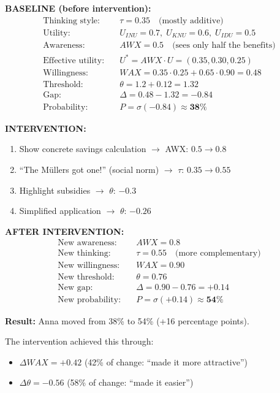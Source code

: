 \begin{example}

\textbf{BASELINE (before intervention):}
\begin{align*}
\text{Thinking style:} \quad & \tau = 0.35 \quad \text{(mostly additive)}\\
\text{Utility:} \quad & U_{INU} = 0.7, \; U_{KNU} = 0.6, \; U_{IDU} = 0.5\\
\text{Awareness:} \quad & AWX = 0.5 \quad \text{(sees only half the benefits)}\\
\text{Effective utility:} \quad & U^* = AWX \cdot U = (0.35, 0.30, 0.25)\\
\text{Willingness:} \quad & WAX = 0.35 \cdot 0.25 + 0.65 \cdot 0.90 = 0.48\\
\text{Threshold:} \quad & \theta = 1.2 + 0.12 = 1.32\\
\text{Gap:} \quad & \Delta = 0.48 - 1.32 = -0.84\\
\text{Probability:} \quad & P = \sigma(-0.84) \approx \mathbf{38\%}
\end{align*}

\textbf{INTERVENTION:}
\begin{enumerate}
\item Show concrete savings calculation $\rightarrow$ AWX: $0.5 \rightarrow 0.8$
\item ``The Müllers got one!'' (social norm) $\rightarrow$ $\tau$: $0.35 \rightarrow 0.55$
\item Highlight subsidies $\rightarrow$ $\theta$: $-0.3$
\item Simplified application $\rightarrow$ $\theta$: $-0.26$
\end{enumerate}

\textbf{AFTER INTERVENTION:}
\begin{align*}
\text{New awareness:} \quad & AWX = 0.8\\
\text{New thinking:} \quad & \tau = 0.55 \quad \text{(more complementary)}\\
\text{New willingness:} \quad & WAX = 0.90\\
\text{New threshold:} \quad & \theta = 0.76\\
\text{New gap:} \quad & \Delta = 0.90 - 0.76 = +0.14\\
\text{New probability:} \quad & P = \sigma(+0.14) \approx \mathbf{54\%}
\end{align*}

\textbf{Result:} Anna moved from 38\% to 54\% (+16 percentage points).

The intervention achieved this through:
\begin{itemize}
\item $\Delta WAX = +0.42$ (42\% of change: ``made it more attractive'')
\item $\Delta \theta = -0.56$ (58\% of change: ``made it easier'')
\end{itemize}
\end{example}

